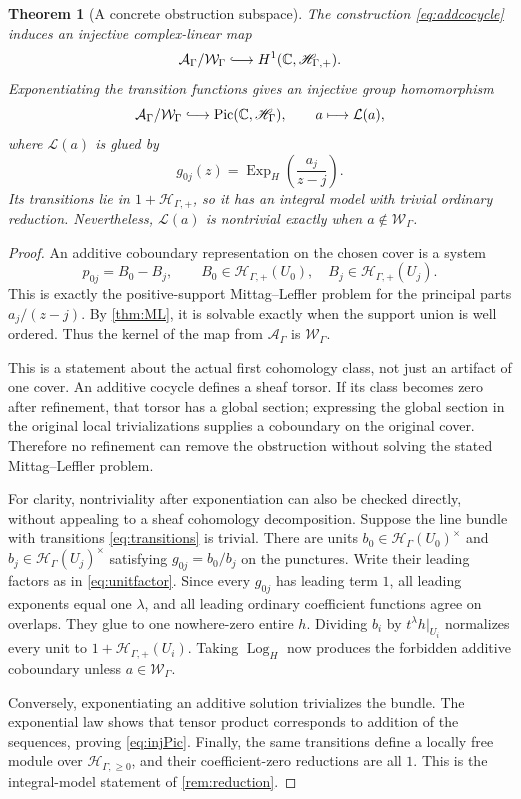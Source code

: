 \documentclass[11pt,letterpaper]{article}
\newtheorem{theorem}{Theorem}[section]
\theoremstyle{definition}
\theoremstyle{remark}
\newcommand{\C}{\mathbb C}
\newcommand{\HH}{\mathscr H_\Gamma}
\newcommand{\HP}{\mathscr H_{\Gamma,+}}
\newcommand{\HI}{\mathscr H_{\Gamma,\ge0}}
\newcommand{\Pic}{\operatorname{Pic}}
\newcommand{\ExpH}{\operatorname{Exp}_{H}}
\newcommand{\LogH}{\operatorname{Log}_{H}}
\numberwithin{equation}{section}
\begin{document}
\begin{theorem}[A concrete obstruction subspace]\label{thm:obstruction}
The construction \eqref{eq:addcocycle} induces an injective complex-linear map
\begin{equation}\label{eq:injH1}
 \mathcal A_\Gamma/\mathcal W_\Gamma
 \lhook\joinrel\longrightarrow H^1(\C,\HP).
\end{equation}
Exponentiating the transition functions gives an injective group homomorphism
\begin{equation}\label{eq:injPic}
 \mathcal A_\Gamma/\mathcal W_\Gamma
 \lhook\joinrel\longrightarrow\Pic(\C,\HH),
 \qquad
 a\longmapsto\mathcal L(a),
\end{equation}
where $\mathcal L(a)$ is glued by
\begin{equation}\label{eq:transitions}
 g_{0j}(z)=\ExpH\!\left(\frac{a_j}{z-j}\right).
\end{equation}
Its transitions lie in $1+\HP$, so it has an integral model with trivial ordinary reduction. Nevertheless, $\mathcal L(a)$ is nontrivial exactly when $a\notin\mathcal W_\Gamma$.
\end{theorem}
\begin{proof}
An additive coboundary representation on the chosen cover is a system
\[
 p_{0j}=B_0-B_j,
 \qquad B_0\in\HP(U_0),\quad B_j\in\HP(U_j).
\]
This is exactly the positive-support Mittag--Leffler problem for the principal parts $a_j/(z-j)$. By \cref{thm:ML}, it is solvable exactly when the support union is well ordered. Thus the kernel of the map from $\mathcal A_\Gamma$ is $\mathcal W_\Gamma$.

This is a statement about the actual first cohomology class, not just an artifact of one cover. An additive cocycle defines a sheaf torsor. If its class becomes zero after refinement, that torsor has a global section; expressing the global section in the original local trivializations supplies a coboundary on the original cover. Therefore no refinement can remove the obstruction without solving the stated Mittag--Leffler problem.

For clarity, nontriviality after exponentiation can also be checked directly, without appealing to a sheaf cohomology decomposition. Suppose the line bundle with transitions \eqref{eq:transitions} is trivial. There are units $b_0\in\HH(U_0)^\times$ and $b_j\in\HH(U_j)^\times$ satisfying $g_{0j}=b_0/b_j$ on the punctures. Write their leading factors as in \eqref{eq:unitfactor}. Since every $g_{0j}$ has leading term $1$, all leading exponents equal one $\lambda$, and all leading ordinary coefficient functions agree on overlaps. They glue to one nowhere-zero entire $h$. Dividing $b_i$ by $t^\lambda h|_{U_i}$ normalizes every unit to $1+\HP(U_i)$. Taking \(\LogH\) now produces the forbidden additive coboundary unless $a\in\mathcal W_\Gamma$.

Conversely, exponentiating an additive solution trivializes the bundle. The exponential law shows that tensor product corresponds to addition of the sequences, proving \eqref{eq:injPic}. Finally, the same transitions define a locally free module over $\HI$, and their coefficient-zero reductions are all $1$. This is the integral-model statement of \cref{rem:reduction}.
\end{proof}
\end{document}
